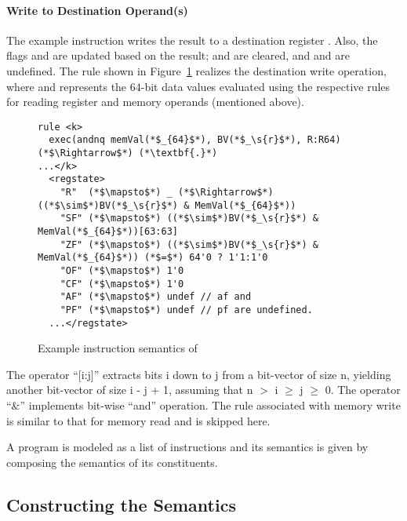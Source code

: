 \paragraph{Write to Destination Operand(s)}
The example instruction writes the result to a destination register . Also, the flags  and  are updated based on the result;  and   are cleared, and  and  are undefined. The rule shown in Figure~\ref{fig:andn-semantics} realizes the destination write operation, where  and  represents the $64$-bit data values evaluated using the respective rules for reading register and memory operands (mentioned above).
%
%
\begin{figure}
\begin{lstlisting}[style=KRULE]
rule <k>
  exec(andnq memVal(*$_{64}$*), BV(*$_\s{r}$*), R:R64) (*$\Rightarrow$*) (*\textbf{.}*)
...</k>
  <regstate>
    "R"  (*$\mapsto$*) _ (*$\Rightarrow$*) ((*$\sim$*)BV(*$_\s{r}$*) & MemVal(*$_{64}$*))
    "SF" (*$\mapsto$*) ((*$\sim$*)BV(*$_\s{r}$*) & MemVal(*$_{64}$*))[63:63]
    "ZF" (*$\mapsto$*) ((*$\sim$*)BV(*$_\s{r}$*) & MemVal(*$_{64}$*)) (*$=$*) 64'0 ? 1'1:1'0
    "OF" (*$\mapsto$*) 1'0
    "CF" (*$\mapsto$*) 1'0
    "AF" (*$\mapsto$*) undef // af and
    "PF" (*$\mapsto$*) undef // pf are undefined.
  ...</regstate>  
\end{lstlisting}
\vspace*{-15pt}
\caption{Example instruction semantics of }
\label{fig:andn-semantics}
\end{figure}
The operator ``[i:j]'' extracts bits i down to j from a bit-vector of size n, yielding another  bit-vector of size i - j + 1, assuming that n $>$ i $\ge$ j $\ge$ 0. The operator ``$\&$'' implements bit-wise ``and'' operation. The rule associated with memory write is similar to that for memory read and is skipped here. 

A \ISA program is modeled as a list of instructions and its semantics is  given by composing the semantics of its constituents.

\subsection{Constructing the \ISA Semantics}
\label{sec:Approach}

%

